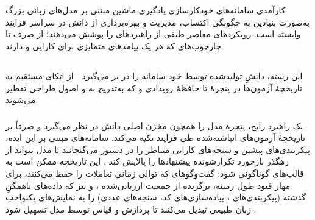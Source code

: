\section[تحلیل منابع دانش]{}

کارآمدی سامانه‌های خودکارسازی یادگیری ماشین مبتنی بر مدل‌های زبانی بزرگ به‌صورت بنیادین به چگونگی اکتساب، مدیریت و بهره‌برداری از دانش در سراسر فرایند  وابسته است. رویکردهای معاصر طیفی از راهبردهای  را پوشش می‌دهند؛ از  صرف تا چارچوب‌های  که هر یک پیامدهای متمایزی برای کارایی  و  دارند.

\subsection[دانش درونی: تاریخچهٔ آزمون و بازتاب]{}
این رسته، دانشِ تولیدشده توسط خود سامانه را در بر می‌گیرد—از اتکای مستقیم به تاریخچهٔ آزمون‌ها در پنجرهٔ  تا حافظهٔ رویدادی و  که به‌تدریج به  و اصول طراحی تقطیر می‌شوند.
\subsubsection{\protect{}}

یک راهبرد رایج، پنجرهٔ  مدل را همچون مخزن اصلی دانش در نظر می‌گیرد و صرفاً بر تاریخچهٔ آزمون‌های انباشته‌شده طی فرایند  تکیه می‌کند. سامانه‌های مبتنی بر این ایده، پیکربندی‌های پیشین و سنجه‌های کارایی متناظر را در دستور می‌گنجانند تا مدل بتواند از رهگذر بازخورد تکرارشونده پیشنهادها را پالایش کند \cite{zhang2023usingLLMforHPO, zheng2023GENIUS, liu2024LLAMBO}. این تاریخچه ممکن است به قالب‌های گوناگونی  شود: گفت‌وگوهای  که توالی زمانی تعاملات را حفظ می‌کنند،  برای مهار قیود طول زمینه،  برگزیده از جمعیت ارزیابی‌شده \cite{zhang2023usingLLMforHPO, chen2023Evoprompting}، و نیز  که داده‌های ناهمگنِ گذشته (پیکربندی‌های ، پیاده‌سازی‌های کد، سنجه‌های عددی) را به نمایش‌های یکنواختِ زبان طبیعی تبدیل می‌کنند تا پردازش و قیاس توسط مدل تسهیل شود \cite{zhang-etal-2024-MLCopilot}.


